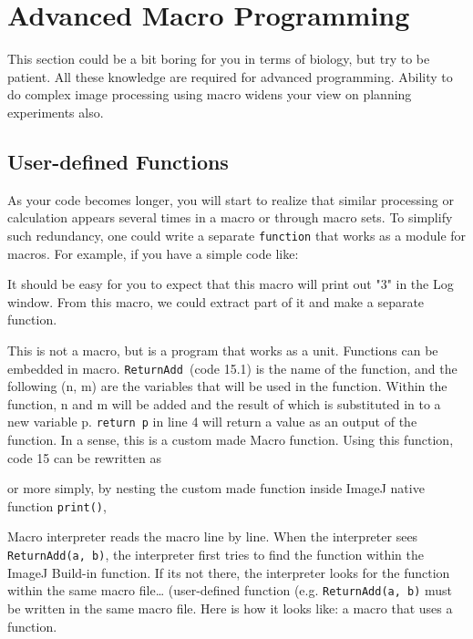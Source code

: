 \documentclass[11pt,a4paper,oneside]{report}
\newcommand{\ilcom}[1]{\texttt{\small#1}}
\begin{document}
\newpage

\section{Advanced Macro Programming}
This section could be a bit boring for you in terms of biology, but try to be patient. 
All these knowledge are required for advanced programming. 
Ability to do complex image processing using macro widens your view on planning experiments also.

\subsection{User-defined Functions}
As your code becomes longer, 
you will start to realize that similar processing or 
calculation appears several times in a macro or through macro sets. 
To simplify such redundancy, one could write a 
separate \ilcom{function} that works as a module for macros. 
For example, if you have a simple code like:

It should be easy for you to expect that this macro will print out "3" in the Log window. 
From this macro, we could extract part of it and make a separate function. 

This is not a macro, but is a program that works as a unit. 
Functions can be embedded in macro. \ilcom{ReturnAdd }(code 15.1) is the name of the function, 
and the following (n, m) are the variables that will be used in the function. Within the function, 
n and m will be added and the result of which is substituted in to a new variable p. 
\ilcom{return p} in line 4 will return a value as an output of the function. 
In a sense, this is a custom made Macro function. Using this function, code 15 can be rewritten as

or more simply, by nesting the custom made function inside ImageJ native function \ilcom{print()},

Macro interpreter reads the macro line by line. When the interpreter sees \ilcom{ReturnAdd(a, b)}, 
the interpreter first tries to find the function within the ImageJ Build-in function. 
If its not there, the interpreter looks for the function within the same macro file\ldots 
(user-defined function (e.g. \ilcom{ReturnAdd(a, b)} must be written in the same macro file. 
Here is how it looks like: a macro that uses a function. 
\end{document}
